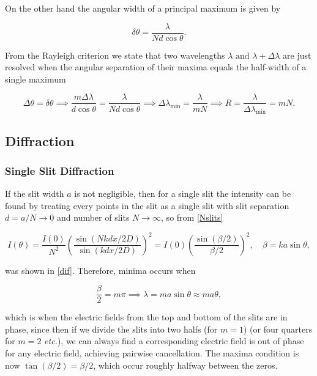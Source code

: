 \documentclass[english,a4paper,12pt]{report}
\begin{document}
On the other hand the angular width of a principal maximum is given by 

\begin{equation}
    \delta \theta = \frac{\lambda }{Nd \cos \theta }. 
\end{equation}

From the Rayleigh criterion we state that two wavelengths \(\lambda \text { and } \lambda +\Delta \lambda \) are just resolved when the angular separation of their maxima equals the half-width of a single maximum

\begin{equation}
    \Delta \theta = \delta \theta \implies \frac{m \Delta \lambda }{d \cos \theta } = \frac{\lambda }{Nd \cos \theta } \implies \Delta \lambda _{\text{min} } = \frac{\lambda }{mN} \implies R = \frac{\lambda }{\Delta \lambda _{\text{min} } }     = mN.
\end{equation}




\subsection{Diffraction}

\subsubsection{Single Slit Diffraction}

If the slit width \(a\) is not negligible, then for a single slit the intensity can be found by treating every points in the slit as a single slit with slit separation \(d = a /N \to 0\) and number of slits \(N \to \infty\), so from \cref{Nslits} 

\begin{equation}
    I(\theta ) =  \frac{I(0)}{N^2}  \left( \frac{\sin \left( Nkdx /2D  \right)}{\sin \left( kdx /2D  \right)}  \right)^2 = I(0) \left( \frac{\sin \left( \beta /2  \right)}{\beta /2 }  \right)^2, \quad \beta  = ka\sin \theta , \label{diffraction} 
\end{equation}

was shown in \cref{dif}. Therefore, minima occurs when

\begin{equation}
    \frac{\beta }{2} = m\pi \implies \lambda = ma\sin \theta \approx ma \theta , 
\end{equation}

which is when the electric fields from the top and bottom of the slits are in phase, since then if we divide the slits into two halfs (for \(m=1\)) (or four quarters for \(m=2\) \textit{etc.}), we can always find a corresponding electric field is out of phase for any electric field, achieving pairwise cancellation. The maxima condition is now \(\tan (\beta /2) = \beta /2\), which occur roughly halfway between the zeros. 
\end{document}
